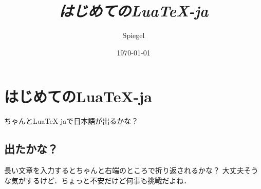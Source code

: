 \documentclass{ltjsarticle}
\title{\emph{はじめてのLua\TeX-ja}}
\author{Spiegel}
\date{\today}
\begin{document}
\maketitle

\section{はじめてのLua\TeX-ja}

ちゃんとLua\TeX-jaで日本語が出るかな？

\subsection{出たかな？}

長い文章を入力するとちゃんと右端のところで折り返されるかな？
大丈夫そうな気がするけど．ちょっと不安だけど何事も挑戦だよね．
\end{document}
